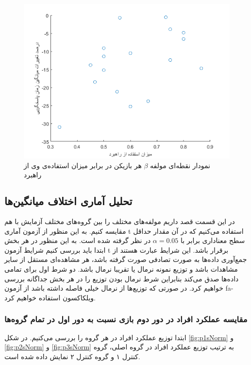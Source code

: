 \documentclass[twoside, a4paper,11pt]{book}
\numberwithin{equation}{chapter}
\numberwithin{table}{chapter}
\numberwithin{figure}{chapter}
\numberwithin{equation}{chapter}
\newcommand{\mls}[1]{\gls{fa-#1}\glsuseri{la-#1}}
\begin{document}
\begin{figure}
\centering
\includegraphics[scale=0.8]{Figures/stUseDtScatter.png}
\caption{\label{fig:stUseDtScatter}
نمودار نقطه‌ای مولفه $\beta$ هر بازیکن در برابر میزان استفاده‌ی وی از راهبرد
}
\end{figure}



\subsection{تحلیل آماری اختلاف میانگین‌ها}
در این قسمت قصد داریم مولفه‌های مختلف را بین گروه‌های مختلف آزمایش با هم مقایسه کنیم. به این منظور از آزمون آماری t  استفاده می‌کنیم که در آن مقدار حداقل سطح معناداری برابر با  $\alpha = 0.05$ در نظر گرفته شده است. به این منظور در هر بخش ابتدا باید بررسی کنیم شرایط آزمون t برقرار باشد. این شرایط عبارت هستند از جمع‌آوری داده‌ها به صورت تصادفی صورت گرفته باشد، هر مشاهده‌ای مستقل از سایر مشاهدات باشد و توزیع نمونه نرمال یا تقریبا نرمال باشد. دو شرط اول برای تمامی داده‌ها صدق می‌کند بنابراین شرط نرمال بودن توزیع را در هر بخش جداگانه بررسی خواهیم کرد. در صورتی که توزیع‌ها از نرمال خیلی فاصله داشته باشد از آزمون \mls{ویلکاکسون} استفاده خواهیم کرد.

\subsubsection{مقایسه عملکرد افراد در دور دوم بازی نسبت به دور اول در تمام گروه‌ها}

ابتدا توزیع عملکرد افراد در هر گروه را بررسی می‌کنیم. در شکل \ref{fig:p1sNorm} و \ref{fig:p2sNorm} و \ref{fig:p3sNorm} به ترتیب توزیع عملکرد افراد در گروه اصلی، گروه کنترل ۱ و گروه کنترل ۲ نمایش داده شده است.
\end{document}
